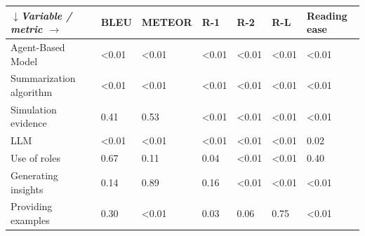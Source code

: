 \begin{tabular}{|l|l|l|l|l|l|l|}
\hline
\textit{$\downarrow$Variable / metric $\rightarrow$} & BLEU & METEOR & R-1 & R-2 & R-L & Reading ease \\
 \hline
 Agent-Based Model & \textless{}0.01 & \textless{}0.01 & \textless{}0.01 & \textless{}0.01 & \textless{}0.01 & \textless{}0.01 \\
 \hline
 Summarization algorithm & \textless{}0.01 & \textless{}0.01 & \textless{}0.01 & \textless{}0.01 & \textless{}0.01 & \textless{}0.01 \\
 \hline
 Simulation evidence & 0.41 & 0.53 & \textless{}0.01 & \textless{}0.01 & \textless{}0.01 & \textless{}0.01 \\
 \hline
 LLM & \textless{}0.01 & \textless{}0.01 & \textless{}0.01 & \textless{}0.01 & \textless{}0.01 & 0.02 \\
 \hline
 Use of roles & 0.67 & 0.11 & 0.04 & \textless{}0.01 & \textless{}0.01 & 0.40 \\
 \hline
 Generating insights & 0.14 & 0.89 & 0.16 & \textless{}0.01 & \textless{}0.01 & \textless{}0.01 \\
 \hline
 Providing examples & 0.30 & \textless{}0.01 & 0.03 & 0.06 & 0.75 & \textless{}0.01 \\
\hline
\end{tabular}

